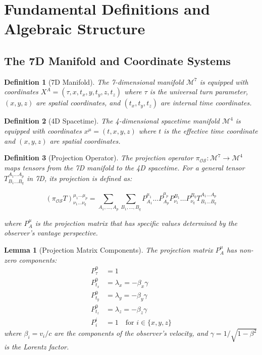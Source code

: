 \documentclass{article}
\newtheorem{lemma}{Lemma}
\newtheorem{definition}{Definition}
\begin{document}
\section{Fundamental Definitions and Algebraic Structure}

\subsection{The 7D Manifold and Coordinate Systems}

\begin{definition}[7D Manifold]
The 7-dimensional manifold $\mathcal{M}^7$ is equipped with coordinates $X^A = (\tau, x, t_x, y, t_y, z, t_z)$ where $\tau$ is the universal turn parameter, $(x,y,z)$ are spatial coordinates, and $(t_x, t_y, t_z)$ are internal time coordinates.
\end{definition}

\begin{definition}[4D Spacetime]
The 4-dimensional spacetime manifold $\mathcal{M}^4$ is equipped with coordinates $x^\mu = (t, x, y, z)$ where $t$ is the effective time coordinate and $(x,y,z)$ are spatial coordinates.
\end{definition}

\begin{definition}[Projection Operator]
The projection operator $\pi_{\mathcal{OS}}: \mathcal{M}^7 \to \mathcal{M}^4$ maps tensors from the 7D manifold to the 4D spacetime. For a general tensor $T^{A_1 \ldots A_p}_{B_1 \ldots B_q}$ in 7D, its projection is defined as:

\begin{equation}
(\pi_{\mathcal{OS}}T)^{\mu_1 \ldots \mu_p}_{\nu_1 \ldots \nu_q} = \sum_{A_1, \ldots, A_p} \sum_{B_1, \ldots, B_q} P^{\mu_1}_{A_1} \ldots P^{\mu_p}_{A_p} P^{B_1}_{\nu_1} \ldots P^{B_q}_{\nu_q} T^{A_1 \ldots A_p}_{B_1 \ldots B_q}
\end{equation}

where $P^{\mu}_{A}$ is the projection matrix that has specific values determined by the observer's vantage perspective.
\end{definition}

\begin{lemma}[Projection Matrix Components]
The projection matrix $P^{\mu}_{A}$ has non-zero components:
\begin{align}
P^{0}_{\tau} &= 1 \\
P^{0}_{t_x} &= \lambda_x = -\beta_x\gamma \\
P^{0}_{t_y} &= \lambda_y = -\beta_y\gamma \\
P^{0}_{t_z} &= \lambda_z = -\beta_z\gamma \\
P^{i}_{i} &= 1 \quad \text{for } i \in \{x,y,z\}
\end{align}
where $\beta_i = v_i/c$ are the components of the observer's velocity, and $\gamma = 1/\sqrt{1-\beta^2}$ is the Lorentz factor.
\end{lemma}
\end{document}
